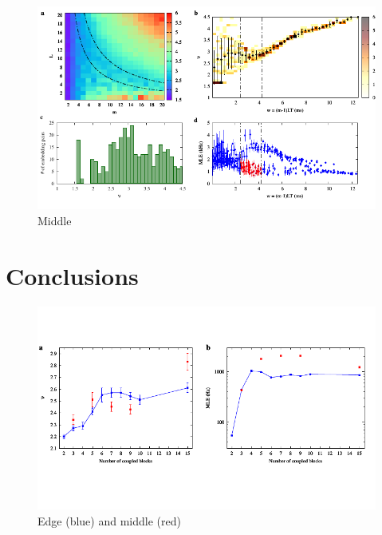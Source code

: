 \begin{figure}[H]
    \centering
    \includegraphics[width=\linewidth]{../15_blocks/middle/2e5_points/plots/chaos_low.pdf}
    \caption{Middle}
    \label{fig:15 blocks middle chaos}
\end{figure}

\section{Conclusions}

\begin{figure}[H]
    \centering
    \includegraphics[width=\linewidth,trim={0 1.5cm 0 1.3cm},clip]
    {../data/nu_mle_blocks.pdf}
    \caption{Edge (blue) and middle (red)}
    \label{fig:nu mle blocks}
\end{figure}
